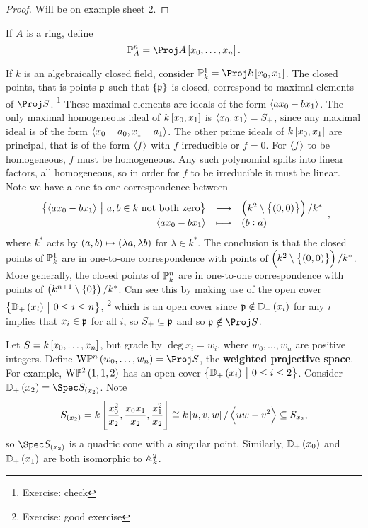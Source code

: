 \begin{proof}
Will be on example sheet $ 2 $.
\end{proof}

\begin{definition*}
If $ A $ is a ring, define
$$ \PP_A^n = \Proj A\sbr{x_0, \dots, x_n}. $$
\end{definition*}

\begin{example*}
If $ k $ is an algebraically closed field, consider $ \PP_k^1 = \Proj k\sbr{x_0, x_1} $. The closed points, that is points $ \ppp $ such that $ \cbr{\ppp} $ is closed, correspond to maximal elements of $ \Proj S $. \footnote{Exercise: check} These maximal elements are ideals of the form $ \abr{ax_0 - bx_1} $. The only maximal homogeneous ideal of $ k\sbr{x_0, x_1} $ is $ \abr{x_0, x_1} = S_+ $, since any maximal ideal is of the form $ \abr{x_0 - a_0, x_1 - a_1} $. The other prime ideals of $ k\sbr{x_0, x_1} $ are principal, that is of the form $ \abr{f} $ with $ f $ irreducible or $ f = 0 $. For $ \abr{f} $ to be homogeneous, $ f $ must be homogeneous. Any such polynomial splits into linear factors, all homogeneous, so in order for $ f $ to be irreducible it must be linear. Note we have a one-to-one correspondence between
$$ \function{\cbr{\abr{ax_0 - bx_1} \st a, b \in k \ \text{not both zero}}}{\br{k^2 \setminus \cbr{\br{0, 0}}} / k^*}{\abr{ax_0 - bx_1}}{\br{b : a}}, $$
where $ k^* $ acts by $ \br{a, b} \mapsto \br{\lambda a, \lambda b} $ for $ \lambda \in k^* $. The conclusion is that the closed points of $ \PP_k^1 $ are in one-to-one correspondence with points of $ \br{k^2 \setminus \cbr{\br{0, 0}}} / k^* $. More generally, the closed points of $ \PP_k^n $ are in one-to-one correspondence with points of $ \br{k^{n + 1} \setminus \cbr{0}} / k^* $. Can see this by making use of the open cover $ \cbr{\DD_+\br{x_i} \st 0 \le i \le n} $, \footnote{Exercise: good exercise} which is an open cover since $ \ppp \notin \DD_+\br{x_i} $ for any $ i $ implies that $ x_i \in \ppp $ for all $ i $, so $ S_+ \subseteq \ppp $ and so $ \ppp \notin \Proj S $.
\end{example*}

\begin{example*}
Let $ S = k\sbr{x_0, \dots, x_n} $, but grade by $ \deg x_i = w_i $, where $ w_0, \dots, w_n $ are positive integers. Define $ \W\PP^n\br{w_0, \dots, w_n} = \Proj S $, the \textbf{weighted projective space}. For example, $ \W\PP^2\br{1, 1, 2} $ has an open cover $ \cbr{\DD_+\br{x_i} \st 0 \le i \le 2} $. Consider $ \DD_+\br{x_2} = \Spec S_{\br{x_2}} $. Note
$$ S_{\br{x_2}} = k\sbr{\dfrac{x_0^2}{x_2}, \dfrac{x_0x_1}{x_2}, \dfrac{x_1^2}{x_2}} \cong k\sbr{u, v, w} / \abr{uw - v^2} \subseteq S_{x_2}, $$
so $ \Spec S_{\br{x_2}} $ is a quadric cone with a singular point. Similarly, $ \DD_+\br{x_0} $ and $ \DD_+\br{x_1} $ are both isomorphic to $ \AA_k^2 $.
\end{example*}

